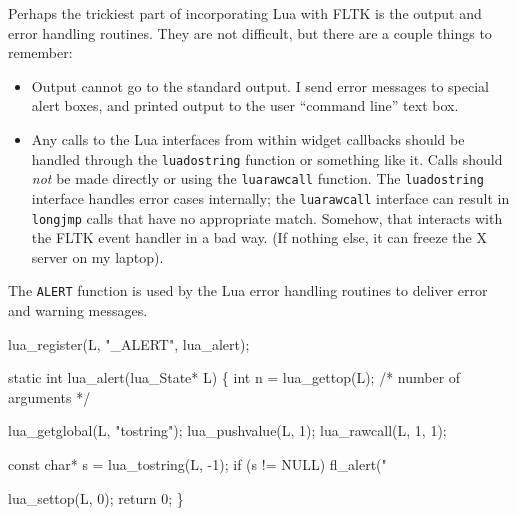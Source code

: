 Perhaps the trickiest part of incorporating Lua with FLTK is the
output and error handling routines.  They are not difficult,
but there are a couple things to remember:
\begin{itemize}
 \item Output cannot go to the standard output.  I send error
       messages to special alert boxes, and printed output
       to the user ``command line'' text box.
 \item Any calls to the Lua interfaces from within widget callbacks
       should be handled through the {\tt{}lua{}dostring} function
       or something like it.  Calls should \emph{not} be made
       directly or using the {\tt{}lua{}rawcall} function.
       The {\tt{}lua{}dostring} interface handles error cases
       internally; the {\tt{}lua{}rawcall} interface can result in
       {\tt{}longjmp} calls that have no appropriate match.  Somehow,
       that interacts with the FLTK event handler in a bad way.
       (If nothing else, it can freeze the X server on my laptop).
\end{itemize}

The {\tt{}{}ALERT} function is used by the Lua error handling routines
to deliver error and warning messages.

\nwenddocs{}\endmoddef
lua_register(L, "_ALERT", lua_alert);

\nwendcode{}\nwdocspar

\nwenddocs{}\endmoddef
static int lua_alert(lua_State* L)
\{
    int n = lua_gettop(L);  /* number of arguments */

    lua_getglobal(L, "tostring");
    lua_pushvalue(L, 1);
    lua_rawcall(L, 1, 1);

    const char* s = lua_tostring(L, -1);
    if (s != NULL)
        fl_alert("%

    lua_settop(L, 0);
    return 0;
\}

\nwendcode{}\nwdocspar

